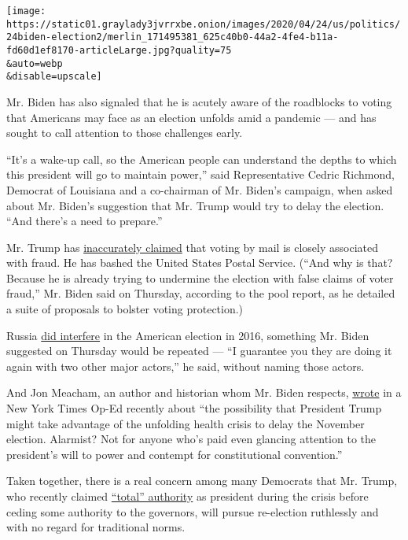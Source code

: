 \texttt{[image: https://static01.graylady3jvrrxbe.onion/images/2020/04/24/us/politics/24biden-election2/merlin\_171495381\_625c40b0-44a2-4fe4-b11a-fd60d1ef8170-articleLarge.jpg?quality=75\\\&auto=webp\\\&disable=upscale]}

Mr. Biden has also signaled that he is acutely aware of the roadblocks
to voting that Americans may face as an election unfolds amid a pandemic
--- and has sought to call attention to those challenges early.

``It's a wake-up call, so the American people can understand the depths
to which this president will go to maintain power,'' said Representative
Cedric Richmond, Democrat of Louisiana and a co-chairman of Mr. Biden's
campaign, when asked about Mr. Biden's suggestion that Mr. Trump would
try to delay the election. ``And there's a need to prepare.''

Mr. Trump has
\href{https://www.nytimes3xbfgragh.onion/article/mail-in-voting-explained.html}{inaccurately
claimed} that voting by mail is closely associated with fraud. He has
bashed the United States Postal Service. (``And why is that? Because he
is already trying to undermine the election with false claims of voter
fraud,'' Mr. Biden said on Thursday, according to the pool report, as he
detailed a suite of proposals to bolster voting protection.)

Russia
\href{https://www.nytimes3xbfgragh.onion/interactive/2018/09/20/us/politics/russia-trump-election-timeline.html}{did
interfere} in the American election in 2016, something Mr. Biden
suggested on Thursday would be repeated --- ``I guarantee you they are
doing it again with two other major actors,'' he said, without naming
those actors.

And Jon Meacham, an author and historian whom Mr. Biden respects,
\href{https://www.nytimes3xbfgragh.onion/2020/03/20/opinion/sunday/coronavirus-election-primary-postpone.html}{wrote}
in a New York Times Op-Ed recently about ``the possibility that
President Trump might take advantage of the unfolding health crisis to
delay the November election. Alarmist? Not for anyone who's paid even
glancing attention to the president's will to power and contempt for
constitutional convention.''

Taken together, there is a real concern among many Democrats that Mr.
Trump, who recently claimed
\href{https://www.nytimes3xbfgragh.onion/2020/04/14/us/politics/trump-total-authority-claim.html}{``total''
authority} as president during the crisis before ceding some authority
to the governors, will pursue re-election ruthlessly and with no regard
for traditional norms.

